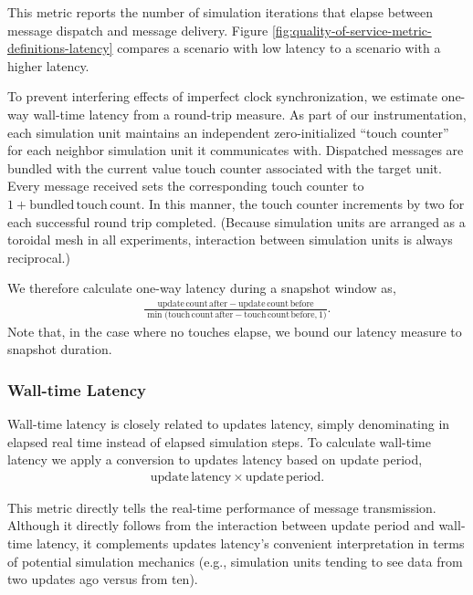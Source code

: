 This metric reports the number of simulation iterations that elapse between message dispatch and message delivery.
Figure \ref{fig:quality-of-service-metric-definitions-latency} compares a scenario with low latency to a scenario with a higher latency.

To prevent interfering effects of imperfect clock synchronization, we estimate one-way wall-time latency from a round-trip measure.
As part of our instrumentation, each simulation unit maintains an independent zero-initialized ``touch counter'' for each neighbor simulation unit it communicates with.
Dispatched messages are bundled with the current value touch counter associated with the target unit.
Every message received sets the corresponding touch counter to $1 + \mathrm{bundled\,touch\,count}$.
In this manner, the touch counter increments by two for each successful round trip completed.
(Because simulation units are arranged as a toroidal mesh in all experiments, interaction between simulation units is always reciprocal.)

We therefore calculate one-way latency during a snapshot window as,
\begin{align*}
  \frac{
    \mathrm{update\,count\,after} - \mathrm{update\,count\,before}
  }{
    \min\Big( \mathrm{ touch\,count\,after } - \mathrm{ touch\,count\,before }, 1 \Big)
  }.
\end{align*}
Note that, in the case where no touches elapse, we bound our latency measure to snapshot duration.


\subsubsection{Wall-time Latency} \label{sec:simulation-time-latency-metric}

Wall-time latency is closely related to updates latency, simply denominating in elapsed real time instead of elapsed simulation steps.
To calculate wall-time latency we apply a conversion to updates latency based on update period,
\begin{align*}
  \mathrm{update\,latency} \times \mathrm{update\,period}.
\end{align*}

This metric directly tells the real-time performance of message transmission.
Although it directly follows from the interaction between update period and wall-time latency, it complements updates latency's convenient interpretation in terms of potential simulation mechanics (e.g., simulation units tending to see data from two updates ago versus from ten).

